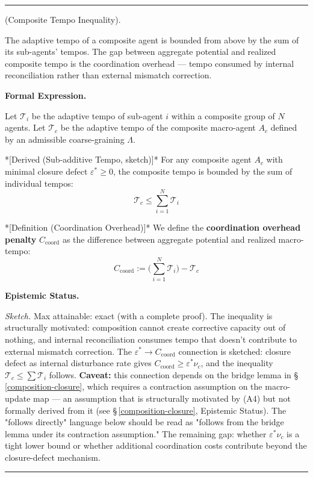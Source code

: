 \documentclass[11pt,oneside]{article}
\newcounter{claim}[section]
\renewcommand{\theclaim}{\thesection.\arabic{claim}}
\newenvironment{segment}[2]{%
  \refstepcounter{claim}%
  \bigskip\noindent\hrule\smallskip
  \noindent{\bfseries #1~\theclaim}\enskip(#2).\par\smallskip
  \noindent\ignorespaces
}{%
  \par\smallskip\noindent\hrule\bigskip
}
\newenvironment{sketch}[1][]{\begin{segment}{Sketch}{#1}}{\end{segment}}
\begin{document}
\begin{sketch}[Composite Tempo Inequality]
\label{tempo-composition}
The adaptive tempo of a composite agent is bounded from above by the sum of its sub-agents' tempos. The gap between aggregate potential and realized composite tempo is the coordination overhead — tempo consumed by internal reconciliation rather than external mismatch correction.



\medskip\noindent\textbf{Formal Expression.}


Let $\mathcal T_i$ be the adaptive tempo of sub-agent $i$ within a composite group of $N$ agents. Let $\mathcal T_c$ be the adaptive tempo of the composite macro-agent $A_c$ defined by an admissible coarse-graining $\Lambda$.

*[Derived (Sub-additive Tempo, sketch)]* For any composite agent $A_c$ with minimal closure defect $\varepsilon^* \geq 0$, the composite tempo is bounded by the sum of individual tempos:
$$ \mathcal{T}_c \leq \sum_{i=1}^N \mathcal{T}_i $$

*[Definition (Coordination Overhead)]* We define the \textbf{coordination overhead penalty} $C_{\text{coord}}$ as the difference between aggregate potential and realized macro-tempo:
$$ C_{\text{coord}} := \Big( \sum_{i=1}^N \mathcal{T}_i \Big) - \mathcal{T}_c $$


\medskip\noindent\textbf{Epistemic Status.}


\textit{Sketch.} Max attainable: exact (with a complete proof). The inequality is structurally motivated: composition cannot create corrective capacity out of nothing, and internal reconciliation consumes tempo that doesn't contribute to external mismatch correction. The $\varepsilon^* \to C_{\text{coord}}$ connection is sketched: closure defect as internal disturbance rate gives $C_{\text{coord}} \geq \varepsilon^* \nu_c$, and the inequality $\mathcal T_c \leq \sum \mathcal T_i$ follows. \textbf{Caveat:} this connection depends on the bridge lemma in \S\,\ref{composition-closure}, which requires a contraction assumption on the macro-update map — an assumption that is structurally motivated by (A4) but not formally derived from it (see \S\,\ref{composition-closure}, Epistemic Status). The "follows directly" language below should be read as "follows from the bridge lemma under its contraction assumption." The remaining gap: whether $\varepsilon^* \nu_c$ is a tight lower bound or whether additional coordination costs contribute beyond the closure-defect mechanism.



\end{sketch}
\end{document}
